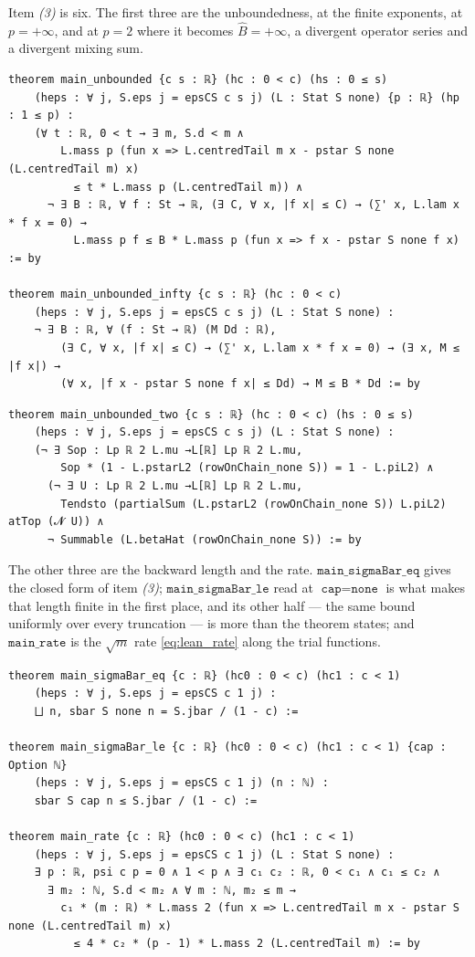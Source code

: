 Item \emph{(3)} is six. The first three are the unboundedness, at the finite exponents, at
$p=+\infty$, and at $p=2$ where it becomes $\widehat B=+\infty$, a divergent operator series
and a divergent mixing sum.
\begin{lstlisting}[style=lean]
theorem main_unbounded {c s : ℝ} (hc : 0 < c) (hs : 0 ≤ s)
    (heps : ∀ j, S.eps j = epsCS c s j) (L : Stat S none) {p : ℝ} (hp : 1 ≤ p) :
    (∀ t : ℝ, 0 < t → ∃ m, S.d < m ∧
        L.mass p (fun x => L.centredTail m x - pstar S none (L.centredTail m) x)
          ≤ t * L.mass p (L.centredTail m)) ∧
      ¬ ∃ B : ℝ, ∀ f : St → ℝ, (∃ C, ∀ x, |f x| ≤ C) → (∑' x, L.lam x * f x = 0) →
          L.mass p f ≤ B * L.mass p (fun x => f x - pstar S none f x) := by

theorem main_unbounded_infty {c s : ℝ} (hc : 0 < c)
    (heps : ∀ j, S.eps j = epsCS c s j) (L : Stat S none) :
    ¬ ∃ B : ℝ, ∀ (f : St → ℝ) (M Dd : ℝ),
        (∃ C, ∀ x, |f x| ≤ C) → (∑' x, L.lam x * f x = 0) → (∃ x, M ≤ |f x|) →
        (∀ x, |f x - pstar S none f x| ≤ Dd) → M ≤ B * Dd := by
\end{lstlisting}
\begin{lstlisting}[style=lean]
theorem main_unbounded_two {c s : ℝ} (hc : 0 < c) (hs : 0 ≤ s)
    (heps : ∀ j, S.eps j = epsCS c s j) (L : Stat S none) :
    (¬ ∃ Sop : Lp ℝ 2 L.mu →L[ℝ] Lp ℝ 2 L.mu,
        Sop * (1 - L.pstarL2 (rowOnChain_none S)) = 1 - L.piL2) ∧
      (¬ ∃ U : Lp ℝ 2 L.mu →L[ℝ] Lp ℝ 2 L.mu,
        Tendsto (partialSum (L.pstarL2 (rowOnChain_none S)) L.piL2) atTop (𝓝 U)) ∧
      ¬ Summable (L.betaHat (rowOnChain_none S)) := by
\end{lstlisting}

The other three are the backward length and the rate. $\texttt{main\_sigmaBar\_eq}$ gives the
closed form of item \emph{(3)}; $\texttt{main\_sigmaBar\_le}$ read at
$\texttt{cap}=\texttt{none}$ is what makes that length finite in the first place, and its other
half --- the same bound uniformly over every truncation --- is more than the theorem states; and
$\texttt{main\_rate}$ is the $\sqrt m$ rate \eqref{eq:lean_rate} along the trial functions.
\begin{lstlisting}[style=lean]
theorem main_sigmaBar_eq {c : ℝ} (hc0 : 0 < c) (hc1 : c < 1)
    (heps : ∀ j, S.eps j = epsCS c 1 j) :
    ⨆ n, sbar S none n = S.jbar / (1 - c) :=

theorem main_sigmaBar_le {c : ℝ} (hc0 : 0 < c) (hc1 : c < 1) {cap : Option ℕ}
    (heps : ∀ j, S.eps j = epsCS c 1 j) (n : ℕ) :
    sbar S cap n ≤ S.jbar / (1 - c) :=

theorem main_rate {c : ℝ} (hc0 : 0 < c) (hc1 : c < 1)
    (heps : ∀ j, S.eps j = epsCS c 1 j) (L : Stat S none) :
    ∃ p : ℝ, psi c p = 0 ∧ 1 < p ∧ ∃ c₁ c₂ : ℝ, 0 < c₁ ∧ c₁ ≤ c₂ ∧
      ∃ m₂ : ℕ, S.d < m₂ ∧ ∀ m : ℕ, m₂ ≤ m →
        c₁ * (m : ℝ) * L.mass 2 (fun x => L.centredTail m x - pstar S none (L.centredTail m) x)
          ≤ 4 * c₂ * (p - 1) * L.mass 2 (L.centredTail m) := by
\end{lstlisting}

